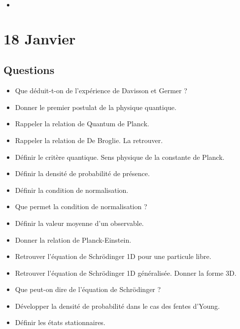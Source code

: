 \documentclass[a4paper, 11pt, hidelinks]{article}
\begin{document}
\begin{itemize}
    \item 
\end{itemize}






\section{18 Janvier}


\subsection{Questions}



\begin{itemize}
    \item Que déduit-t-on de l'expérience de Davisson et Germer ? \cite{Chapitre21}
    \item Donner le premier postulat de la physique quantique. \cite{Chapitre21}
    \item Rappeler la relation de Quantum de Planck. \cite{Chapitre21}
    \item Rappeler la relation de De Broglie. La retrouver. \cite{Chapitre21}
    \item Définir le critère quantique. Sens physique de la constante de Planck. \cite{Chapitre21}
    \item Définir la densité de probabilité de présence. \cite{Chapitre21}
    \item Définir la condition de normalisation. \cite{Chapitre21}
    \item Que permet la condition de normalisation ? \cite{Chapitre21}
    \item Définir la valeur moyenne d'un observable. \cite{Chapitre21}
    \item Donner la relation de Planck-Einstein. \cite{Chapitre21}
    \item Retrouver l'équation de Schrödinger 1D pour une particule libre. \cite{Chapitre21}
    \item Retrouver l'équation de Schrödinger 1D généralisée. Donner la forme 3D. \cite{Chapitre21}
    \item Que peut-on dire de l'équation de Schrödinger ? \cite{Chapitre21}
    \item Développer la densité de probabilité dans le cas des fentes d'Young. \cite{Chapitre21}
    \item Définir les états stationnaires. \cite{Chapitre21}

\end{itemize}
\end{document}
